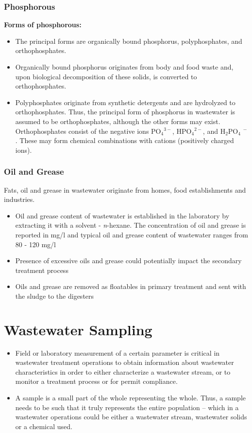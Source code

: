 \documentclass{article}
\begin{document}
		\subsubsection{Phosphorous}			
		\textbf{Forms of phosphorous:}\\
					      \begin{itemize}
					      	\item The principal forms are organically bound phosphorus, polyphosphates, and orthophosphates.
					      	\item Organically bound phosphorus originates from body and food waste and, upon biological decomposition of these solids, is converted to orthophosphates. 
					      	\item Polyphosphates originate from synthetic detergents and are hydrolyzed to orthophosphates. Thus, the principal form of phosphorus in wastewater is assumed to be orthophosphates, although the other forms may exist. Orthophosphates consist of the negative ions PO$_4$$^{3-}$, HPO$_4$$^{2-}$, and H$_2$PO$_4$ $^-$.  These may form chemical combinations with cations (positively charged ions).
					      \end{itemize}

\subsubsection{Oil and Grease}	
			Fats, oil and grease in wastewater originate from homes, food establishments and industries.
			\begin{itemize}
				\item Oil and grease content of wastewater is established in the laboratory by extracting it with a solvent - \textit{n}-hexane.  The concentration of oil and grease is reported in mg/l and typical oil and grease content of wastewater ranges from 80 - 120 mg/l
				\item Presence of excessive oils and grease could potentially impact the secondary treatment process
				\item Oils and grease are removed as floatables in primary treatment and sent with the sludge to the digesters
			\end{itemize}
\newpage	
\section{Wastewater Sampling}		
		\begin{itemize}
			\item Field or laboratory measurement of a certain parameter is critical in wastewater treatment operations to obtain information about wastewater characteristics in order to either characterize a wastewater stream, or to monitor a treatment process or for permit compliance.  
			\item A sample is a small part of the whole representing the whole.  Thus, a sample needs to be such that it truly represents the entire population – which in a wastewater operations could be either a wastewater stream, wastewater solids or a chemical used.
		\end{itemize}
		
\end{document}
